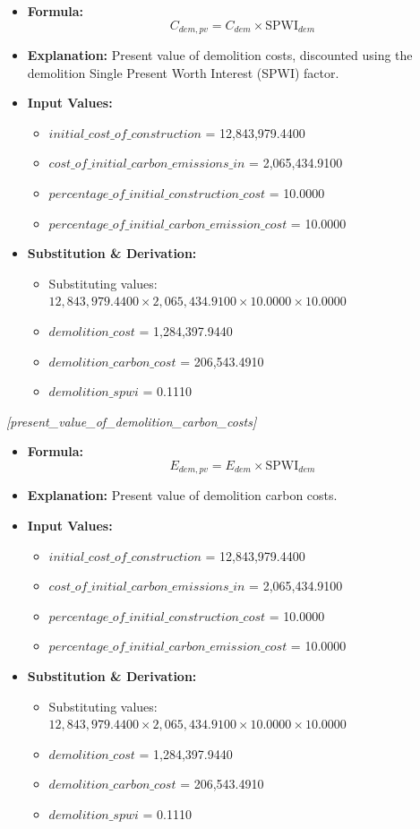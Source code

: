 \documentclass[12pt,a4paper]{article}
\begin{document}
\begin{itemize}
  \item \textbf{Formula:} $$C_{dem,pv} = C_{dem} \times \text{SPWI}_{dem}$$
  \item \textbf{Explanation:} Present value of demolition costs, discounted using the demolition Single Present Worth Interest (SPWI) factor.
  \item \textbf{Input Values:}
  \begin{itemize}
    \item $initial\_cost\_of\_construction$ = 12,843,979.4400
    \item $cost\_of\_initial\_carbon\_emissions\_in$ = 2,065,434.9100
    \item $percentage\_of\_initial\_construction\_cost$ = 10.0000
    \item $percentage\_of\_initial\_carbon\_emission\_cost$ = 10.0000
  \end{itemize}
  \item \textbf{Substitution \& Derivation:}
  \begin{itemize}
    \item Substituting values: $12,843,979.4400 \times 2,065,434.9100 \times 10.0000 \times 10.0000$
    \item $demolition\_cost$ = 1,284,397.9440
    \item $demolition\_carbon\_cost$ = 206,543.4910
    \item $demolition\_spwi$ = 0.1110
  \end{itemize}
\end{itemize}


\textit{[present\_value\_of\_demolition\_carbon\_costs]}

\begin{itemize}
  \item \textbf{Formula:} $$E_{dem,pv} = E_{dem} \times \text{SPWI}_{dem}$$
  \item \textbf{Explanation:} Present value of demolition carbon costs.
  \item \textbf{Input Values:}
  \begin{itemize}
    \item $initial\_cost\_of\_construction$ = 12,843,979.4400
    \item $cost\_of\_initial\_carbon\_emissions\_in$ = 2,065,434.9100
    \item $percentage\_of\_initial\_construction\_cost$ = 10.0000
    \item $percentage\_of\_initial\_carbon\_emission\_cost$ = 10.0000
  \end{itemize}
  \item \textbf{Substitution \& Derivation:}
  \begin{itemize}
    \item Substituting values: $12,843,979.4400 \times 2,065,434.9100 \times 10.0000 \times 10.0000$
    \item $demolition\_cost$ = 1,284,397.9440
    \item $demolition\_carbon\_cost$ = 206,543.4910
    \item $demolition\_spwi$ = 0.1110
  \end{itemize}
\end{itemize}
\end{document}

